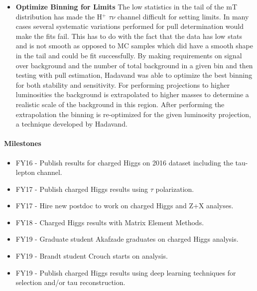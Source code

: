 \begin{itemize}[noitemsep,nolistsep,leftmargin=*]
\item[]{{\bf Optimize Binning for Limits} %
The low statistics in the tail of the mT distribution has made the H$^+$ \too $\tau \nu$ channel difficult for setting limits.  In many cases several systematic variations performed for pull determination would make the fits fail.  
This has to do with the fact that the data has low stats and is not smooth as opposed to MC samples which did have a smooth shape in the tail and could be fit successfully.
By making requirements on signal over background and the number of total background in a given
bin and then testing with pull estimation, Hadavand was able to optimize the best binning for both stability and sensitivity.  For performing projections to higher luminosities the background is extrapolated to higher masses
to determine a realistic scale of the background in this region. After performing the extrapolation the binning is re-optimized for the given luminosity projection, a technique developed by Hadavand.}
\end{itemize}
\paragraph{Milestones}
\begin{itemize}[noitemsep,nolistsep]
\item{FY16 - Publish results for charged Higgs on 2016 dataset including the tau-lepton channel.}
\item{FY17 - Publish charged Higgs results using $\tau$ polarization.}
\item{FY17 - Hire new postdoc to work on charged Higgs and Z+X analyses.}
\item{FY18 - Charged Higgs results with Matrix Element Methods.}
\item{FY19 - Graduate student Akafzade graduates on charged Higgs analysis.}
\item{FY19 - Brandt student Crouch starts on analysis.}
\item{FY19 - Publish charged Higgs results using deep learning techniques for selection and/or tau reconstruction.}
\end{itemize}


